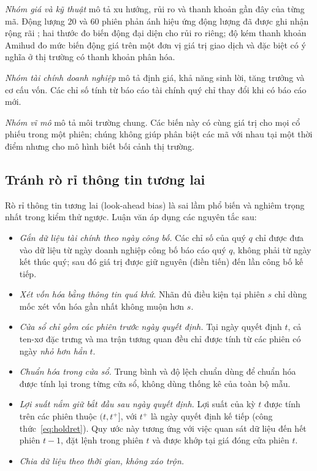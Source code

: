 \textit{Nhóm giá và kỹ thuật} mô tả xu hướng, rủi ro và thanh khoản gần đây của từng mã. Động lượng 20 và 60 phiên phản ánh hiệu ứng động lượng đã được ghi nhận rộng rãi \cite{jegadeesh1993}; hai thước đo biến động đại diện cho rủi ro riêng; độ kém thanh khoản Amihud đo mức biến động giá trên một đơn vị giá trị giao dịch và đặc biệt có ý nghĩa ở thị trường có thanh khoản phân hóa.

\textit{Nhóm tài chính doanh nghiệp} mô tả định giá, khả năng sinh lời, tăng trưởng và cơ cấu vốn. Các chỉ số tính từ báo cáo tài chính quý chỉ thay đổi khi có báo cáo mới.

\textit{Nhóm vĩ mô} mô tả môi trường chung. Các biến này có cùng giá trị cho mọi cổ phiếu trong một phiên; chúng không giúp phân biệt các mã với nhau tại một thời điểm nhưng cho mô hình biết bối cảnh thị trường.

\subsection{Tránh rò rỉ thông tin tương lai}
\label{sec:leakage}

Rò rỉ thông tin tương lai (look-ahead bias) là sai lầm phổ biến và nghiêm trọng nhất trong kiểm thử ngược. Luận văn áp dụng các nguyên tắc sau:
\begin{itemize}
  \item \textit{Gắn dữ liệu tài chính theo ngày công bố.} Các chỉ số của quý $q$ chỉ được đưa vào dữ liệu từ ngày doanh nghiệp công bố báo cáo quý $q$, không phải từ ngày kết thúc quý; sau đó giá trị được giữ nguyên (điền tiến) đến lần công bố kế tiếp.
  \item \textit{Xét vốn hóa bằng thông tin quá khứ.} Nhãn đủ điều kiện tại phiên $s$ chỉ dùng mốc xét vốn hóa gần nhất không muộn hơn $s$.
  \item \textit{Cửa sổ chỉ gồm các phiên trước ngày quyết định.} Tại ngày quyết định $t$, cả ten-xơ đặc trưng và ma trận tương quan đều chỉ được tính từ các phiên có ngày \emph{nhỏ hơn hẳn} $t$.
  \item \textit{Chuẩn hóa trong cửa sổ.} Trung bình và độ lệch chuẩn dùng để chuẩn hóa được tính lại trong từng cửa sổ, không dùng thống kê của toàn bộ mẫu.
  \item \textit{Lợi suất nắm giữ bắt đầu sau ngày quyết định.} Lợi suất của kỳ $t$ được tính trên các phiên thuộc $(t,t^{+}]$, với $t^{+}$ là ngày quyết định kế tiếp (công thức~\eqref{eq:holdret}). Quy ước này tương ứng với việc quan sát dữ liệu đến hết phiên $t-1$, đặt lệnh trong phiên $t$ và được khớp tại giá đóng cửa phiên $t$.
  \item \textit{Chia dữ liệu theo thời gian, không xáo trộn.}
\end{itemize}

